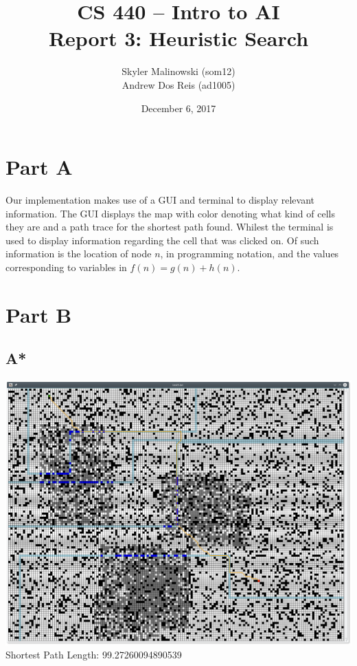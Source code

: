 \documentclass[12pt]{article}
\begin{document}
\title{CS 440 -- Intro to AI \\ Report 3: Heuristic Search}
\author{Skyler Malinowski (som12) \\ Andrew Dos Reis (ad1005)}
\date{December 6, 2017}
\maketitle

\newpage

\section{Part A}
Our implementation makes use of a GUI and terminal to display relevant information. The GUI displays the map with color denoting what kind of cells they are and a path trace for the shortest path found. Whilest the terminal is used to display information regarding the cell that was clicked on. Of such information is the location of node \(n\), in programming notation, and the values corresponding to variables in \(f(n) = g(n) + h(n)\).

\section{Part B}
\subsection{A*}
\includegraphics[scale=0.415]{aStar1.png}
\newline
Shortest Path Length: 99.27260094890539
\end{document}
